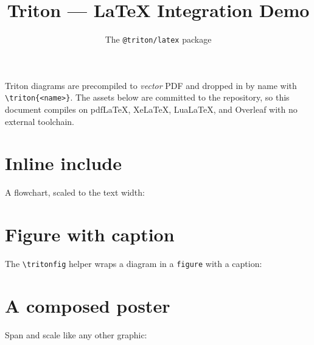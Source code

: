 \documentclass{article}
\title{Triton --- LaTeX Integration Demo}
\author{The \texttt{@triton/latex} package}
\date{}
\begin{document}
\maketitle

Triton diagrams are precompiled to \emph{vector} PDF and dropped in by name with
\verb|\triton{<name>}|. The assets below are committed to the repository, so this
document compiles on pdf\LaTeX{}, Xe\LaTeX{}, Lua\LaTeX{}, and Overleaf with no
external toolchain.

\section{Inline include}

A flowchart, scaled to the text width:

\begin{center}
\end{center}

\section{Figure with caption}

The \verb|\tritonfig| helper wraps a diagram in a \texttt{figure} with a caption:


\section{A composed poster}

Span and scale like any other graphic:

\begin{center}
\end{center}
\end{document}
